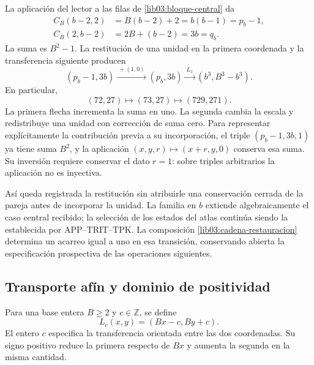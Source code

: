 La aplicación del lector a las filas de \eqref{lib03:bloque-central} da
\begin{align}
 C_B(b-2,2)&=B(b-2)+2=b(b-1)=p_b-1,\\
 C_B(2,b-2)&=2B+(b-2)=3b=q_b.
 \label{lib03:concatenaciones}
\end{align}
La suma es \(B^2-1\). La restitución de una unidad en la primera
coordenada y la transferencia siguiente producen
\begin{equation}
 (p_b-1,3b)\xrightarrow{\ +(1,0)\ }(p_b,3b)
 \xrightarrow{\ L_1\ }(b^3,B^3-b^3).
 \label{lib03:cadena-restauracion}
\end{equation}
En particular,
\begin{equation}
 (72,27)\longmapsto(73,27)\longmapsto(729,271).
 \label{lib03:cadena-central}
\end{equation}
La primera flecha incrementa la suma en uno. La segunda cambia la escala
y redistribuye una unidad con corrección de suma cero. Para representar
explícitamente la contribución previa a su incorporación, el triple
\((p_b-1,3b,1)\) ya tiene suma \(B^2\), y la aplicación
\((x,y,r)\mapsto(x+r,y,0)\) conserva esa suma. Su inversión requiere
conservar el dato \(r=1\): sobre triples arbitrarios la aplicación no
es inyectiva.

Así queda registrada la restitución sin atribuirle una conservación
cerrada de la pareja antes de incorporar la unidad. La familia en \(b\)
extiende algebraicamente el caso central recibido; la selección de los
estados del atlas continúa siendo la establecida por APP--TRIT--TPK.
La composición \eqref{lib03:cadena-restauracion} determina un acarreo
igual a uno en esa transición, conservando abierta la especificación
prospectiva de las operaciones siguientes.

\subsection{Transporte afín y dominio de positividad}
\label{lib03:afin}

\begin{definition}
\label{lib03:def-transporte}
Para una base entera \(B\geq2\) y \(c\in\mathbb Z\), se define
\begin{equation}
 L_c(x,y)=(Bx-c,By+c).
 \label{lib03:lc}
\end{equation}
El entero \(c\) especifica la transferencia orientada entre las dos
coordenadas. Su signo positivo reduce la primera respecto de \(Bx\)
y aumenta la segunda en la misma cantidad.
\end{definition}

